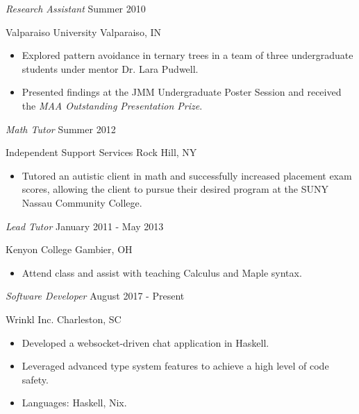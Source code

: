 \documentclass[11pt,article,oneside]{memoir}
\begin{document}
\ind \emph{Research Assistant} \hfill {\small Summer 2010}

\ind Valparaiso University \hfill {\small Valparaiso, IN}
\small
\begin{itemize}
  \item Explored pattern avoidance in ternary trees in a team of three
    undergraduate students under mentor Dr. Lara Pudwell.
  \item Presented findings at the JMM Undergraduate Poster Session and received
    the \emph{MAA Outstanding Presentation Prize}.
\end{itemize}
\normalsize

\bigskip





\ind \emph{Math Tutor} \hfill {\small Summer 2012}

\ind Independent Support Services \hfill {\small Rock Hill, NY}
\small
\begin{itemize}
  \item Tutored an autistic client in math and successfully increased placement
    exam scores, allowing the client to pursue their desired program at the
    SUNY Nassau Community College.
\end{itemize}
\normalsize

\ind \emph{Lead Tutor} \hfill {\small January 2011 - May 2013}

\ind Kenyon College \hfill {\small Gambier, OH}
\small
\begin{itemize}
  \item Attend class and assist with teaching Calculus and Maple syntax.
\end{itemize}
\normalsize

\bigskip



\ind \emph{Software Developer} \hfill {\small August 2017 - Present}
\vspace{0.1em}

\ind Wrinkl Inc. \hfill {\small Charleston, SC}
\small
\begin{itemize}
  \item Developed a websocket-driven chat application in Haskell.
  \item Leveraged advanced type system features to achieve a high level of code
    safety.
  \item Languages: Haskell, Nix.
\end{itemize}
\normalsize
\end{document}
